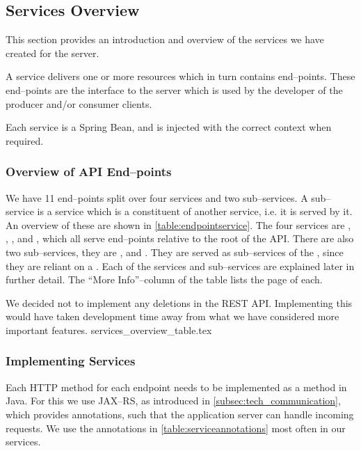 \subsection{Services Overview}\label{sec:services_overview}
This section provides an introduction and overview of the services we have created for the server.

A service delivers one or more resources which in turn contains end--points.
These end--points are the interface to the server which is used by the developer of the producer and/or consumer clients.

Each service is a Spring Bean, and is injected with the correct context when required. 

\subsubsection*{Overview of API End--points}
We have 11 end--points split over four services and two sub--services.
A sub--service is a service which is a constituent of another service, i.e. it is served by it.
An overview of these are shown in \cref{table:endpointservice}.
The four services are , , , and , 
which all serve end--points relative to the root of the API.
There are also two sub--services, they are , and .
They are served as sub--services of the , since they are reliant on a .
Each of the services and sub--services are explained later in further detail.
The ``More Info''--column of the table lists the page of each.

We decided not to implement any deletions in the REST API.
Implementing this would have taken development time away from what we have considered more important features. 
{services_overview_table.tex}

\subsubsection*{Implementing Services}
Each HTTP method for each endpoint needs to be implemented as a method in Java.
For this we use JAX--RS, as introduced in \cref{subsec:tech_communication}, which provides annotations, such that the application server can handle incoming requests.
We use the annotations in \cref{table:serviceannotations} most often in our services.


